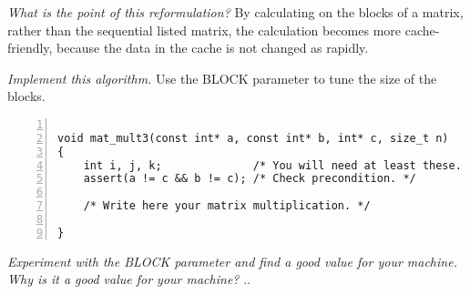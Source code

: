 \documentclass{article}
\begin{document}
\begin{ExerciseList}
\Exercise
{}

\Question
\emph{What is the point of this reformulation?}
\Answer By calculating on the blocks of a matrix, rather than the sequential listed matrix, the calculation becomes more cache-friendly, because the data in the cache is not changed as rapidly. 


\Question
\emph{Implement this algorithm.} Use the BLOCK parameter to tune the
size of the blocks.

\begin{lstlisting}[basicstyle=\small\sffamily,
keywords={break,case,const,continue,default,else,enum,
for,if,return,switch,while,do,long,void,int,float,double,
char,struct,typedef,include,size\_t},
keywordstyle={\color{blue}},
comment={[l]{//}}, morecomment={[s]{/*}{*/}}, commentstyle=\itshape,
columns={[l]flexible}, numbers=left, numberstyle=\tiny,
frameround=fftt, frame=shadowbox, captionpos=b,
caption={Matrix multiplication function.},
label=LST:MatMulFunc3]

void mat_mult3(const int* a, const int* b, int* c, size_t n)
{
    int i, j, k;              /* You will need at least these. */
    assert(a != c && b != c); /* Check precondition. */

    /* Write here your matrix multiplication. */

}
\end{lstlisting}

\Question
\emph{Experiment with the BLOCK parameter and find a good value for
  your machine. Why is it a good value for your machine?}
\Answer .. %


\end{ExerciseList}
\end{document}

